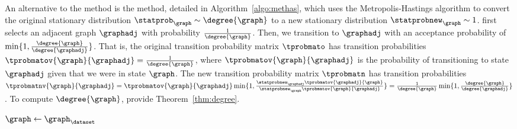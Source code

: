 An alternative to the \selfloop{} method is the \methas{} method, detailed in
Algorithm~\ref{algo:methas}, which uses the Metropolis-Hastings algorithm to
convert the original stationary distribution $\statprob_\graph \sim
\degree{\graph}$ to a new stationary distribution $\statprobnew_\graph \sim 1$.
\findadj{} first selects an adjacent graph $\graphadj$ with probability
$\frac{1}{\degree{\graph}}$. Then, we transition to $\graphadj$ with an
acceptance probability of $\min\{1,
\frac{\degree{\graph}}{\degree{\graphadj}}\}$. That is, the original transition
probability matrix $\tprobmato$ has transition probabilities
$\tprobmatov{\graph}{\graphadj} = \frac{1}{\degree{\graph}}$, where
$\tprobmatov{\graph}{\graphadj}$ is the probability of transitioning to state
$\graphadj$ given that we were in state $\graph$. The new transition
probability matrix $\tprobmatn$ has transition probabilities
$\tprobmatnv{\graph}{\graphadj} = \tprobmatov{\graph}{\graphadj} \min\{1,
\frac{\statprobnew_{\graphadj} \tprobmatov{\graphadj}{\graph}}{\statprobnew_\graph
\tprobmatov{\graph}{\graphadj}}\} = \frac{1}{\degree{\graph}} \min\{1,
\frac{\degree{\graph}}{\degree{\graphadj}}\}$. To compute $\degree{\graph}$,
\citet{GionisMMT07} provide Theorem~\ref{thm:degree}.

\begin{algorithm}
	\caption{\methas}\label{algo:methas}
	\DontPrintSemicolon{}

	$\graph \leftarrow \graph_\dataset$\;
	\Return{$\graph$}
\end{algorithm}

